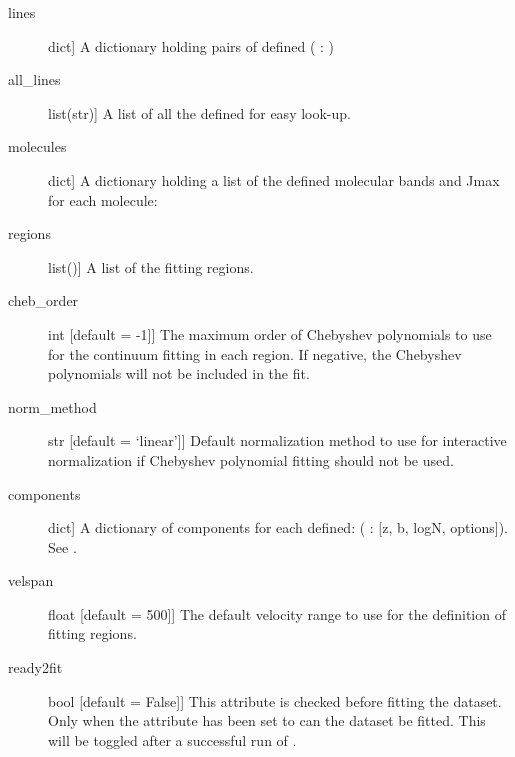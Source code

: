 \documentclass[letterpaper,10pt,english]{sphinxmanual}
\begin{document}
\begin{fulllineitems}
\begin{description}
\item[{lines}] \leavevmode{[}dict{]}
A dictionary holding pairs of defined ( : {\hyperref[\detokenize{api:dataset.Line}]{}})

\item[{all\_lines}] \leavevmode{[}list(str){]}
A list of all the defined  for easy look-up.

\item[{molecules}] \leavevmode{[}dict{]}
A dictionary holding a list of the defined molecular bands and Jmax
for each molecule:

\item[{regions}] \leavevmode{[}list({\hyperref[\detokenize{api:regions.Region}]{}}){]}
A list of the fitting regions.

\item[{cheb\_order}] \leavevmode{[}int   {[}default = -1{]}{]}
The maximum order of Chebyshev polynomials to use for the continuum
fitting in each region. If negative, the Chebyshev polynomials will
not be included in the fit.

\item[{norm\_method}] \leavevmode{[}str   {[}default = ‘linear’{]}{]}
Default normalization method to use for interactive normalization
if Chebyshev polynomial fitting should not be used.

\item[{components}] \leavevmode{[}dict{]}
A dictionary of components for each  defined:
( : {[}z, b, logN, options{]}). See {\hyperref[\detokenize{api:VoigtFit.DataSet.add_component}]{}}.

\item[{velspan}] \leavevmode{[}float   {[}default = 500{]}{]}
The default velocity range to use for the definition
of fitting regions.

\item[{ready2fit}] \leavevmode{[}bool   {[}default = False{]}{]}
This attribute is checked before fitting the dataset. Only when
the attribute has been set to  can the dataset be fitted.
This will be toggled after a successful run of
{\hyperref[\detokenize{api:VoigtFit.DataSet.prepare_dataset}]{}}.


\end{description}
\end{fulllineitems}
\end{document}
